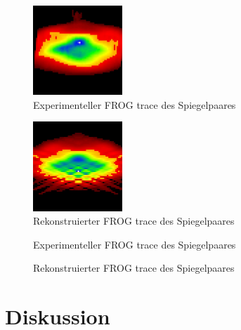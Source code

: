 \documentclass[twoside,        %
               BCOR12mm,       %
               english,ngerman, %
               fleqn,headsepline=false,footsepline=false
              ]{Vorlage/MFPREPORT}
\begin{document}
\begin{figure}[]
    \centering
    \includegraphics[width=0.3\textwidth]{chirpsp1.jpg}
    \caption{Experimenteller FROG trace des Spiegelpaares}
    \label{fig:chirpspiegel1}
\end{figure}
\begin{figure}[]
    \centering
    \includegraphics[width=0.3\textwidth]{chirpsp2.jpg}
    \caption{Rekonstruierter FROG trace des Spiegelpaares}
    \label{fig:chirpspiegel2}
\end{figure}
\begin{figure}[]
    \centering
    
    \caption{Experimenteller FROG trace des Spiegelpaares}
    \label{fig:chirptemp}
\end{figure}
\begin{figure}[]
    \centering
    
    \caption{Rekonstruierter FROG trace des Spiegelpaares}
    \label{fig:chirpspec}
\end{figure}

\section{Diskussion}
\cite{tidecks1990current}



\end{document}
